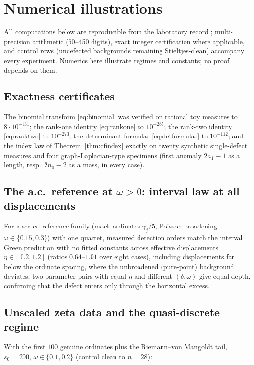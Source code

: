 \documentclass[11pt]{amsart}
\theoremstyle{definition}
\theoremstyle{remark}
\begin{document}
\section{Numerical illustrations}\label{sec:numerics}

All computations below are reproducible from the laboratory record
\cite{LabRecord}; multi-precision arithmetic (60--450 digits), exact
integer certification where applicable, and control rows (undefected
backgrounds remaining Stieltjes-clean) accompany every experiment. Numerics
here illustrate regimes and constants; no proof depends on them.

\subsection{Exactness certificates}
The binomial transform \eqref{eq:binomial} was verified on rational toy
measures to $8\cdot10^{-131}$; the rank-one identity \eqref{eq:rankone} to
$10^{-285}$; the rank-two identity \eqref{eq:ranktwo} to $10^{-273}$; the
determinant formulas \eqref{eq:detformulas} to $10^{-112}$; and the index
law of Theorem~\ref{thm:cfindex} exactly on twenty synthetic single-defect
measures and four graph-Laplacian-type specimens (first anomaly
$2n_1-1$ as a length, resp.\ $2n_0-2$ as a mass, in every case).

\subsection{The a.c.\ reference at $\omega>0$: interval law at all
displacements}
For a scaled reference family (mock ordinates $\gamma_j/5$, Poisson
broadening $\omega\in\{0.15,0.3\}$) with one quartet, measured detection
orders match the interval Green prediction with no fitted constants across
effective displacements $\eta\in[0.2,1.2]$ (ratios $0.64$--$1.01$ over
eight cases), including displacements far below the ordinate spacing, where
the unbroadened (pure-point) background deviates; two parameter pairs with
equal $\eta$ and different $(\delta,\omega)$ give equal depth, confirming
that the defect enters only through the horizontal excess.

\subsection{Unscaled zeta data and the quasi-discrete regime}
With the first $100$ genuine ordinates plus the Riemann--von Mangoldt tail,
$s_0=200$, $\omega\in\{0.1,0.2\}$ (control clean to $n=28$):
\end{document}
